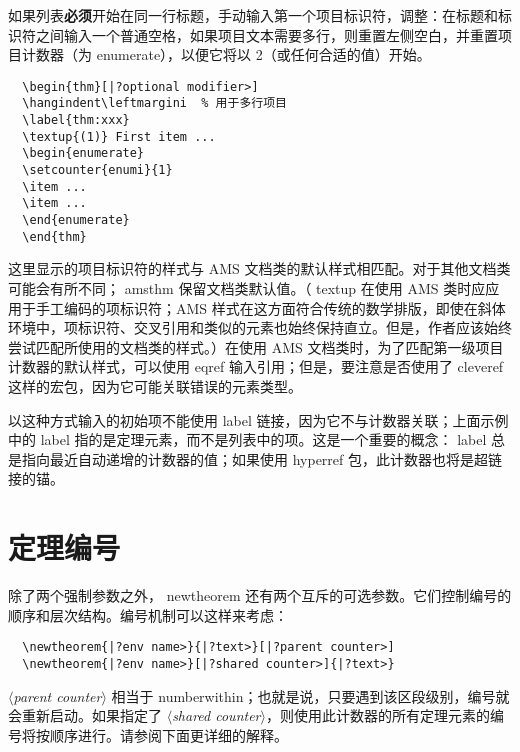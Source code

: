 \documentclass[11pt,twoside]{article}
\renewcommand{\emph}[1]{\textbf{#1}}
\newcommand{\ntt}{%
  \fontfamily\ttdefault \fontseries\mddefault \fontshape\updefault
  \selectfont
}
\DeclareRobustCommand{\cn}[1]{{\ntt\bslchar#1}}
\DeclareRobustCommand{\pkg}[1]{{\ntt#1}}
\DeclareRobustCommand{\env}[1]{{\ntt#1}}
\def\<#1>{{\normalfont$\langle$\textit{#1}$\rangle$}}
\begin{document}
如果列表\emph{必须}开始在同一行标题，手动输入第一个项目标识符，调整：在标题和标识符之间输入一个普通空格，如果项目文本需要多行，则重置左侧空白，并重置项目计数器（为 \env{enumerate}），以便它将以 2（或任何合适的值）开始。
\begin{verbatim}
  \begin{thm}[|?optional modifier>]
  \hangindent\leftmargini  % 用于多行项目
  \label{thm:xxx}
  \textup{(1)} First item ...
  \begin{enumerate}
  \setcounter{enumi}{1}
  \item ...
  \item ...
  \end{enumerate}
  \end{thm}
\end{verbatim}
这里显示的项目标识符的样式与 AMS 文档类的默认样式相匹配。对于其他文档类可能会有所不同；\pkg{amsthm} 保留文档类默认值。（\cn{textup} 在使用 AMS 类时应应用于手工编码的项标识符；AMS 样式在这方面符合传统的数学排版，即使在斜体环境中，项标识符、交叉引用和类似的元素也始终保持直立。但是，作者应该始终尝试匹配所使用的文档类的样式。）在使用 AMS 文档类时，为了匹配第一级项目计数器的默认样式，可以使用 \cn{eqref} 输入引用；但是，要注意是否使用了 \pkg{cleveref} 这样的宏包，因为它可能关联错误的元素类型。

以这种方式输入的初始项不能使用 \cn{label} 链接，因为它不与计数器关联；上面示例中的 \cn{label} 指的是定理元素，而不是列表中的项。这是一个重要的概念：\cn{label} 总是指向最近自动递增的计数器的值；如果使用 \pkg{hyperref} 包，此计数器也将是超链接的锚。




\enlargethispage{1\baselineskip} %

\section{定理编号}

除了两个强制参数之外，\cn{newtheorem} 还有两个互斥的可选参数。它们控制编号的顺序和层次结构。编号机制可以这样来考虑：
\begin{verbatim}
  \newtheorem{|?env name>}{|?text>}[|?parent counter>]
  \newtheorem{|?env name>}[|?shared counter>]{|?text>}
\end{verbatim}
\<parent counter> 相当于 \cn{numberwithin}；也就是说，只要遇到该区段级别，编号就会重新启动。如果指定了 \<shared counter>，则使用此计数器的所有定理元素的编号将按顺序进行。请参阅下面更详细的解释。
\end{document}

